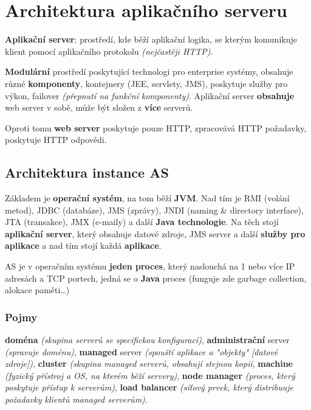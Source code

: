 \section{Architektura aplikačního serveru}

\textbf{Aplikační server}: prostředí, kde běží aplikační logika, se kterým komunikuje klient pomocí aplikačního protokolu \textit{(nejčastěji HTTP)}.

\vspace{4pt}
\noindent \textbf{Modulární} prostředí poskytující technologi pro enterprise systémy, obsahuje různé \textbf{komponenty}, kontejnery (JEE, servlety, JMS), poskytuje služby pro výkon, failover \textit{(přepnutí na funkční komponenty)}. Aplikační server \textbf{obsahuje} web server v sobě, může být složen z \textbf{více} serverů.

\vspace{4pt}
\noindent Oproti tomu \textbf{web server} poskytuje pouze HTTP, zpracovává HTTP požadavky, poskytuje HTTP odpovědi.

\subsection{Architektura instance AS}

Základem je \textbf{operační systém}, na tom běží \textbf{JVM}. Nad tím je RMI (volání metod), JDBC (databáze), JMS (zprávy), JNDI (naming \& directory interface), JTA (transakce), JMX (e-maily) a další \textbf{Java technologie}. Na těch stojí \textbf{aplikační server}, který obsahuje datové zdroje, JMS server a další \textbf{služby pro aplikace} a nad tím stojí každá \textbf{aplikace}.

\vspace{4pt}
\noindent AS je v operačním systému \textbf{jeden proces}, který naslouchá na 1 nebo více IP adresách a TCP portech, jedná se o \textbf{Java} proces (funguje zde garbage collection, alokace paměti\ldots)

\subsubsection*{Pojmy}

\textbf{doména} \textit{(skupina serverů se specifickou konfigurací)}, \textbf{administrační} server \textit{(spravuje doménu)}, \textbf{managed} server \textit{(spouští aplikace a "objekty" [datové zdroje])}, \textbf{cluster} \textit{(skupina managed serverů, obsahují stejnou kopii}, \textbf{machine} \textit{(fyzický přístroj a OS, na kterém běží servery)}, \textbf{node manager} \textit{(proces, který poskytuje přístup k serverům)}, \textbf{load balancer} \textit{(síťový prvek, který distribuuje požadavky klientů managed serverům)}.

